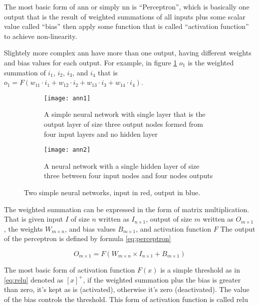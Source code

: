 The most basic form of \gls{ann} or simply \gls{nn} is ``Perceptron'',
which is basically one output that is the result of weighted summations of
all inputs plus some scalar value called ``bias'' then apply some function that is called ``activation function''
to achieve non-linearity.

Slightely more complex \gls{ann} have more than one output, having different weights and bias values for each output.
For example, in figure \ref{fig:ann1} \(o_1\) is the weighted summation of \(i_1\), \(i_2\), \(i_3\), and \(i_4\) that is
\( o_1 = F(w_{11}\cdot i_1 + w_{12}\cdot i_2 + w_{13}\cdot i_3 + w_{14}\cdot i_4) \).

\begin{figure}[!ht]
\centering
    \begin{subfigure}[b]{0.48\textwidth}
        \centering
        \texttt{[image: ann1]}
        \caption{A simple neural network with single layer that is the output layer of size three output nodes formed from four input layers and no hidden layer}\label{fig:ann1}
    \end{subfigure}
    \begin{subfigure}[b]{0.48\textwidth}
        \centering
        \texttt{[image: ann2]}
        \caption{A neural network with a single hidden layer of size three between four input nodes and four nodes outputs}\label{fig:ann2}
    \end{subfigure}
\caption{Two simple neural networks, input in red, output in blue.}\label{fig:ann}
\end{figure}


The weighted summation can be expressed in the form of matrix multiplication.
That is given input \(I\) of size \(n\) written as \(I_{n\times 1}\),
output of size \(m\) written as \(O_{m\times 1}\),
the weights \(W_{m\times n}\), and bias values \( B_{m\times 1} \), and activation function \( F \)
The output of the perceptron is defined by formula \ref{eq:perceptron}

\begin{equation}
O_{m\times 1} = F( W_{m\times n} \times I_{n\times 1} + B_{m\times 1} )
\label{eq:perceptron}
\end{equation}

The most basic form of activation function \(F(x)\) is a simple threshold as in \ref{eq:relu} denoted as \( [x]^+ \),
if the weighted summation plus the bias is greater than zero, it's kept as is (activated),
otherwise it's zero (deactivated). The value of the bias controls the threshold.
This form of activation function is called
\gls{relu}\autocite{hahnloser2001permitted}\autocite{jarrett2009best}\autocite{nair2010rectified}

